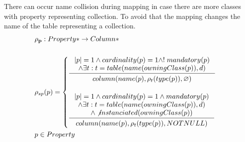 \documentclass[11pt]{article}
\begin{document}
There can occur name collision during mapping in case there are more classes with property representing collection. To avoid that the mapping changes the name of the table representing a collection.
\begin{align*}
&	\mathbf{\rho_p} : Property* \rightarrow Column* \\ \\
&	\rho_{sp}(p) = \begin{cases}
 		\inference{|p| = 1 \wedge cardinality(p) = 1 \wedge !\;mandatory(p)
 			\\ \wedge \exists t : t = table(name(owningClass(p)), d) 
		 }{\begin{gathered}
	  		column(name(p), \rho_t(type(p)), \varnothing )
		\end{gathered}} \\ \\
  		\inference{|p| = 1 \wedge cardinality(p) = 1 \wedge mandatory(p)
			 \\ \wedge \exists t : t = table(name(owningClass(p)), d)
			\\ \wedge \not instanciated(owningClass(p))
		}{\begin{gathered}
 	 		column(name(p), \rho_t(type(p)), NOTNULL ) \\ 
		\end{gathered}}
	\end{cases}\\
&	p \in Property
\end{align*}
\end{document}
